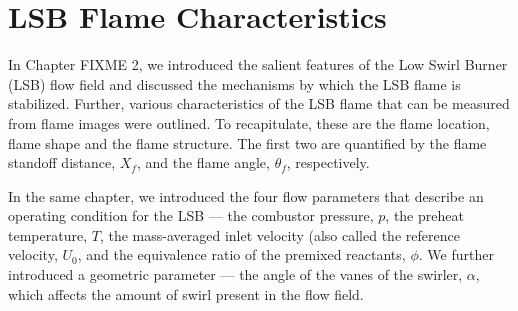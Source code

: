 \chapter{LSB Flame Characteristics}






In Chapter FIXME 2, we introduced the salient features of the Low Swirl Burner (LSB) flow field and discussed the mechanisms by which the LSB flame is stabilized.
Further, various characteristics of the LSB flame that can be measured from flame images were outlined.
To recapitulate, these are the flame location, flame shape and the flame structure.
The first two are quantified by the flame standoff distance, \(X_f\), and the flame angle, \(\theta_f\), respectively.

In the same chapter, we introduced the four flow parameters that describe an operating condition for the LSB --- the combustor pressure, \(p\), the preheat temperature, \(T\), the mass-averaged inlet velocity (also called the reference velocity, \(U_0\), and the equivalence ratio of the premixed reactants, \(\phi\).
We further introduced a geometric parameter --- the angle of the vanes of the swirler, \(\alpha\), which affects the amount of swirl present in the flow field.

